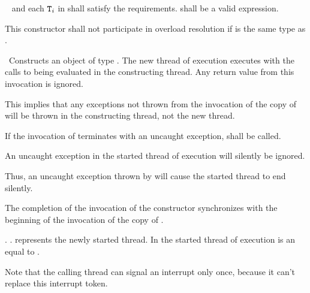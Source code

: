 \begin{itemdescr}
  \pnum
\requires\  and each $\texttt{T}_i$ in  shall satisfy the
 requirements.
 shall be
a valid expression.

\pnum\remarks
This constructor shall not participate in overload resolution if 
is the same type as .

\pnum\effects\ Constructs an object of type . The new thread of execution executes
 with the calls to
 being evaluated in the constructing thread. Any return value from this invocation
is ignored. \begin{note} This implies that any exceptions not thrown from the invocation of the copy
of  will be thrown in the constructing thread, not the new thread. \end{note} If the
invocation of
termi\-nates with an uncaught exception,  shall be called.

{\color{diffcolor}
An uncaught  exception in the started thread of execution
will silently be ignored.
\begin{note} Thus, an uncaught exception thrown by 
             will cause the started thread to end silently.
             \end{note}
}%

\pnum\sync The completion of the invocation of the constructor
synchronizes with the beginning of the invocation of the copy of .

{\color{diffcolor}
\pnum\postconditions {}.
                     .
                      represents the newly started thread.
                     In the started thread of execution 
                     is an  equal to . 
\begin{note} Note that the calling thread can signal an interrupt only once,
                because it can't replace this interrupt token.  \end{note}
}%


\end{itemdescr}
